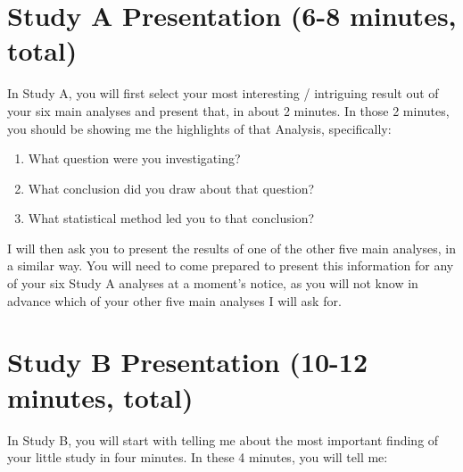 \documentclass[]{book}
\providecommand{\tightlist}{%
  \setlength{\itemsep}{0pt}\setlength{\parskip}{0pt}}
\begin{document}
\hypertarget{study-a-presentation-6-8-minutes-total}{%
\section{Study A Presentation (6-8 minutes, total)}\label{study-a-presentation-6-8-minutes-total}}

In Study A, you will first select your most interesting / intriguing result out of your six main analyses and present that, in about 2 minutes. In those 2 minutes, you should be showing me the highlights of that Analysis, specifically:

\begin{enumerate}
\def\labelenumi{\alph{enumi}.}
\tightlist
\item
  What question were you investigating?
\item
  What conclusion did you draw about that question?
\item
  What statistical method led you to that conclusion?
\end{enumerate}

I will then ask you to present the results of one of the other five main analyses, in a similar way. You will need to come prepared to present this information for any of your six Study A analyses at a moment's notice, as you will not know in advance which of your other five main analyses I will ask for.

\hypertarget{study-b-presentation-10-12-minutes-total}{%
\section{Study B Presentation (10-12 minutes, total)}\label{study-b-presentation-10-12-minutes-total}}

In Study B, you will start with telling me about the most important finding of your little study in four minutes. In these 4 minutes, you will tell me:
\end{document}
